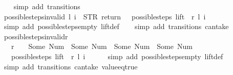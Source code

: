 \begin{isabellebody}
\ \ \isamarkupfalse%
\ {\isacharparenleft}simp\ add{\isacharcolon}\ transitions{\isacharparenright}%
\endisatagproof
{\isafoldproof}%
%
\isadelimproof
\isanewline
%
\endisadelimproof
\isanewline
{}\isamarkupfalse%
\ possible{\isacharunderscore}steps{\isacharunderscore}{}{\isacharunderscore}invalid{\isacharcolon}\ {\isachardoublequoteopen}{\isacharparenleft}l{\isacharcomma}\ i{\isacharparenright}\ {\isasymnoteq}\ {\isacharparenleft}STR\ {\isacharprime}{\isacharprime}return{\isacharprime}{\isacharprime}{\isacharcomma}\ {\isacharbrackleft}{\isacharbrackright}{\isacharparenright}\ {\isasymLongrightarrow}\ possible{\isacharunderscore}steps\ lift\ {}\ r\ l\ i\ {\isacharequal}\ {\isacharbraceleft}{\isacharbar}{\isacharbar}{\isacharbraceright}{\isachardoublequoteclose}\isanewline
%
\isadelimproof
\ \ %
\endisadelimproof
%
\isatagproof
{}\isamarkupfalse%
\ {\isacharparenleft}simp\ add{\isacharcolon}\ possible{\isacharunderscore}steps{\isacharunderscore}empty\ lift{\isacharunderscore}def{\isacharparenright}\isanewline
\ \ \isamarkupfalse%
\ {\isacharparenleft}simp\ add{\isacharcolon}\ transitions\ can{\isacharunderscore}take{\isacharparenright}%
\endisatagproof
{\isafoldproof}%
%
\isadelimproof
\isanewline
%
\endisadelimproof
\isanewline
{}\isamarkupfalse%
\ possible{\isacharunderscore}steps{\isacharunderscore}{}{\isacharunderscore}invalid{\isacharunderscore}r{}{\isacharcolon}\ \isanewline
\ \ \ {\isachardoublequoteopen}r\ {\isachardollar}\ {}\ {\isasymnotin}\ {\isacharbraceleft}Some\ {\isacharparenleft}Num\ {}{\isacharparenright}{\isacharcomma}\ Some\ {\isacharparenleft}Num\ {}{\isacharparenright}{\isacharcomma}\ Some\ {\isacharparenleft}Num\ {}{\isacharparenright}{\isacharcomma}\ Some\ {\isacharparenleft}Num\ {}{\isacharparenright}{\isacharbraceright}{\isachardoublequoteclose}\isanewline
\ \ \ {\isachardoublequoteopen}possible{\isacharunderscore}steps\ lift\ {}\ r\ l\ i\ {\isacharequal}\ {\isacharbraceleft}{\isacharbar}{\isacharbar}{\isacharbraceright}{\isachardoublequoteclose}\isanewline
%
\isadelimproof
\ \ %
\endisadelimproof
%
\isatagproof
{}\isamarkupfalse%
\ {\isacharparenleft}simp\ add{\isacharcolon}\ possible{\isacharunderscore}steps{\isacharunderscore}empty\ lift{\isacharunderscore}def{\isacharparenright}\isanewline
\ \ \isamarkupfalse%
\ {\isacharparenleft}simp\ add{\isacharcolon}\ transitions\ can{\isacharunderscore}take\ value{\isacharunderscore}eq{\isacharunderscore}true{\isacharparenright}\isanewline

\end{isabellebody}
